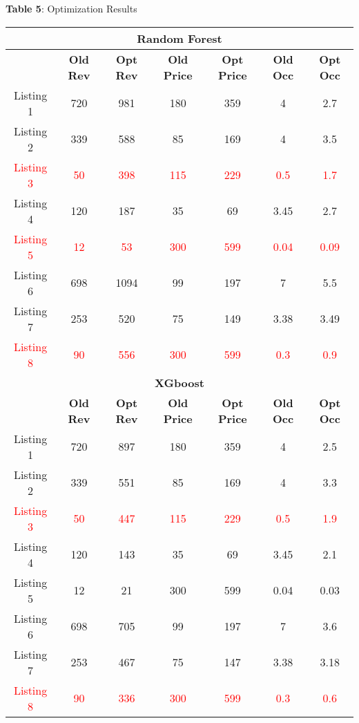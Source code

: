 \documentclass[12pt]{article}
\begin{document}
\begin{center}
\textbf{Table 5}: Optimization Results \\[0.2cm] 
\begin{tabular}{ |c|c|c|c|c|c|c| } 
 \hline
 \multicolumn{7}{|c|}{\textbf{Random Forest}}\\
 
 \hline 

  & \textbf{Old Rev}  & \textbf{Opt Rev} & \textbf{Old Price} & \textbf{Opt Price}& \textbf{Old Occ}& \textbf{Opt Occ}\\ [0.05cm]
 \hline
  Listing 1 & 720 & 981 &180 &359  &4 &2.7\\ 
 \hline
 Listing 2 & 339 & 588 &85 &169  &4 &3.5   \\ 
 \hline
 \textcolor{red}{Listing 3}   & \textcolor{red}{50} & \textcolor{red}{398} & \textcolor{red}{115} & \textcolor{red}{229} & \textcolor{red}{0.5} & \textcolor{red}{1.7} \\
 \hline
  Listing 4   & 120 & 187 &35 &69  &3.45 &2.7 \\
 \hline
  \textcolor{red}{Listing 5}   & \textcolor{red}{12} & \textcolor{red}{53} & \textcolor{red}{300} & \textcolor{red}{599}  & \textcolor{red}{0.04} & \textcolor{red}{0.09} \\
 \hline
  Listing 6   & 698 & 1094 &99 &197  &7 &5.5 \\
 \hline 
 Listing 7   & 253 & 520 &75 &149  &3.38 &3.49 \\
 \hline
 \textcolor{red}{Listing 8}   & \textcolor{red}{90} & \textcolor{red}{556} & \textcolor{red}{300} & \textcolor{red}{599}  & \textcolor{red}{0.3} & \textcolor{red}{0.9} \\
 \hline
 \multicolumn{7}{|c|}{\textbf{XGboost}}\\
 
 \hline 

  & \textbf{Old Rev}  & \textbf{Opt Rev} & \textbf{Old Price} & \textbf{Opt Price}& \textbf{Old Occ}& \textbf{Opt Occ}\\ [0.05cm]
 \hline
  Listing 1 & 720 & 897 &180 &359  &4 &2.5\\ 
 \hline
 Listing 2 & 339 & 551 &85 &169  &4 &3.3   \\ 
 \hline
 \textcolor{red}{Listing 3}   & \textcolor{red}{50} & \textcolor{red}{447} & \textcolor{red}{115} & \textcolor{red}{229}  & \textcolor{red}{0.5} & \textcolor{red}{1.9} \\
 \hline
  Listing 4   & 120 & 143 &35 &69  &3.45 &2.1 \\
 \hline
  Listing 5   & {12} & {21} &{300} &{599}  &{0.04} &{0.03} \\
 \hline
  Listing 6   & 698 & 705 &99 &197  &7 &3.6 \\
 \hline 
 Listing 7   & 253 & 467 &75 &147  &3.38 &3.18 \\
 \hline
 \textcolor{red}{Listing 8}   & \textcolor{red}{90} & \textcolor{red}{336} & \textcolor{red}{300} & \textcolor{red}{599}  & \textcolor{red}{0.3} & \textcolor{red}{0.6} \\
 \hline
 

\end{tabular}
\end{center}
\end{document}
